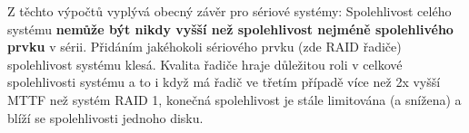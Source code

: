 \documentclass[10pt]{article} %
\begin{document}
\begin{enumerate}
		Z těchto výpočtů vyplývá obecný závěr pro sériové systémy: Spolehlivost celého systému \textbf{nemůže být nikdy vyšší než spolehlivost nejméně spolehlivého prvku} v sérii. Přidáním jakéhokoli sériového prvku (zde RAID řadiče) spolehlivost systému klesá. Kvalita řadiče hraje důležitou roli v celkové spolehlivosti systému a to i když má řadič ve třetím případě více než 2x vyšší MTTF než systém RAID 1, konečná spolehlivost je stále limitována (a snížena) a blíží se spolehlivosti jednoho disku.
		
	\end{enumerate}
	
	\printbibliography
	
\end{document}
